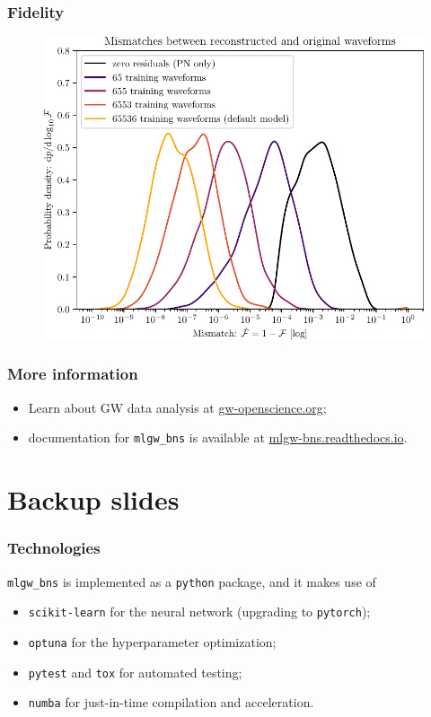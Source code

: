 \documentclass{beamer}
\begin{document}
\begin{frame}
    \frametitle{Fidelity}
    \begin{figure}[ht]
    \centering
    \includegraphics[width=.85\textwidth]{figures/mismatches_by_n_train}
    \end{figure}
\end{frame}

\begin{frame}
    \frametitle{More information}
    \begin{itemize}
        \item Learn about GW data analysis at \url{gw-openscience.org};
        \item documentation for \texttt{mlgw\_bns} is available at \url{mlgw-bns.readthedocs.io}.
    \end{itemize}
\end{frame}

\section{Backup slides}

\begin{frame}
    \frametitle{Technologies}
    \texttt{mlgw\_bns} is implemented as a \texttt{python} package, and it makes use of 
    \begin{itemize}
        \item \texttt{scikit-learn} for the neural network (upgrading to \texttt{pytorch});
        \item \texttt{optuna} for the hyperparameter optimization;
        \item \texttt{pytest} and \texttt{tox} for automated testing;
        \item \texttt{numba} for just-in-time compilation and acceleration.
    \end{itemize}
\end{frame}
\end{document}
